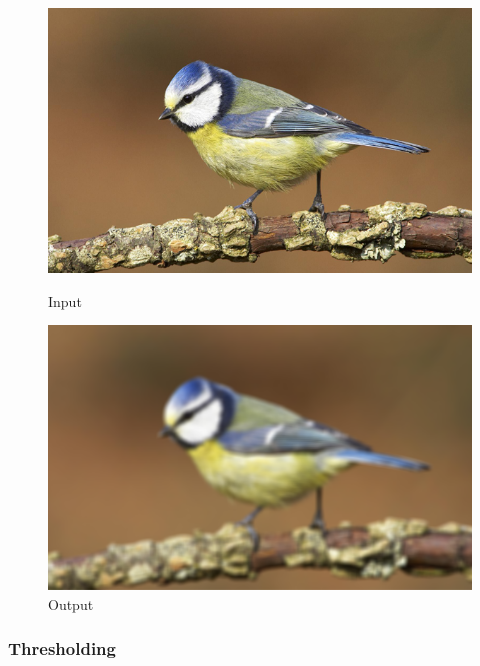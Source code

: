 \begin{figure}[htb]
    \centering
    \begin{minipage}[t]{0.45\linewidth}
        \centering
        \includegraphics[width=\linewidth]{pics/bildverarbeitungsalgos/input.png}
        \caption{Input \cite{maai:input:cite}}
        \label{maai:gaussianblur:input}
    \end{minipage}
    \hfill
    \begin{minipage}[t]{0.45\linewidth}
        \centering
        \includegraphics[width=\linewidth]{pics/bildverarbeitungsalgos/gaussianblur_output.png}
        \caption{Output}
        \label{maai:gaussianblur:output}
    \end{minipage}
\end{figure}


\subsubsection{Thresholding}

